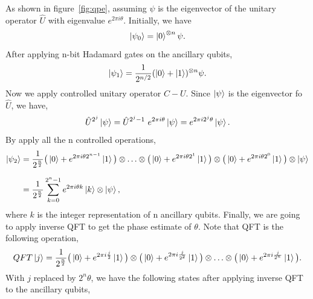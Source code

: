 \documentclass[a4paper]{article}
\begin{document}
As shown in figure~\ref{fig:qpe}, assuming $\psi$ is the eigenvector of the unitary operator $\hat U$ with eigenvalue $e^{2 \pi i \theta}$. Initially, we have
    \begin{equation} \label{eq:eq2}
    \setlength{\jot}{10pt}
        \ket{\psi_0}   =   \ket{0}^{\otimes n} \psi.
    \end{equation}
After applying n-bit Hadamard gates on the ancillary qubits,
    \begin{equation} \label{eq:eq3}
    \setlength{\jot}{10pt}
        \ket{\psi_1}   =   \frac{1}{2^{n/2}} (\ket{0} + \ket{1})^{\otimes n} \psi.
    \end{equation}
Now we apply controlled unitary operator $C-U$. Since $\ket{\psi}$ is the eigenvector fo $\hat{U}$, we have,
    \begin{equation} \label{eq:eq4}
    \setlength{\jot}{10pt}
        \hat{U}^{2^j} \ket \psi   =   \hat{U}^{2^j - 1} \ e^{2 \pi i \theta} \ket{\psi}   =   e^{2 \pi i 2^j \theta} \ket{\psi}.
    \end{equation}
By apply all the n controlled operations,
    \begin{equation} \label{eq:eq5}
    \setlength{\jot}{10pt}
    \begin{aligned}
        \ket{\psi_2}   &=   \frac{1}{2^{\frac{n}{2}}}   \big(\ket{0} + e^{2 \pi i \theta 2^{n-1}} \ket{1} \big)
        \otimes \dotso 
        \otimes \big(\ket{0} + e^{2 \pi i \theta 2^{1}} \ket{1} \big)
        \otimes \big(\ket{0} + e^{2 \pi i \theta 2^{0}} \ket{1} \big)
        \otimes \ket{\psi} \\
        &=   \frac{1}{2^{\frac{n}{2}}}   \sum_{k=0}^{2^n - 1}   e^{2 \pi i \theta k} \ket{k}   \otimes \ket{\psi},
    \end{aligned}
    \end{equation}
where $k$ is the integer representation of n ancillary qubits.
Finally, we are going to apply inverse QFT to get the phase estimate of $\theta$. Note that QFT is the following operation,
    \begin{equation} \label{eq:eq6}
    \setlength{\jot}{10pt}
        QFT \ket{j}   =   \frac{1}{2^{\frac{n}{2}}}   { \big( \ket{0} + e^{2 \pi i \frac{j}{2}} \ket{1} \big)
        \otimes \big( \ket{0} + e^{2 \pi i \frac{j}{2^2}} \ket{1} \big)
        \otimes \dotso 
        \otimes \big( \ket{0} + e^{2 \pi i \frac{j}{2^n}} \ket{1} \big) }.
    \end{equation}
With $j$ replaced by $2^n \theta$, we have the following states after applying inverse QFT to the ancillary qubits,
\end{document}

